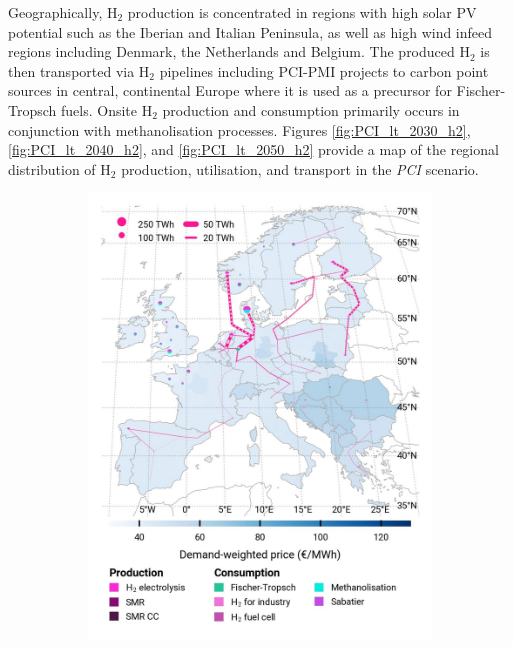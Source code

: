\documentclass[pdflatex,sn-nature]{sn-jnl}%
\theoremstyle{thmstyleone}%
\theoremstyle{thmstyletwo}%
\theoremstyle{thmstylethree}%
\begin{document}
Geographically, H$_2$ production is concentrated in regions with high solar PV potential such as the Iberian and Italian Peninsula, as well as high wind infeed regions including Denmark, the Netherlands and Belgium. The produced H$_2$ is then transported via H$_2$ pipelines including PCI-PMI projects to carbon point sources  in central, continental Europe where it is used as a precursor for Fischer-Tropsch fuels. Onsite H$_2$ production and consumption primarily occurs in conjunction with methanolisation processes. Figures \ref{fig:PCI_lt_2030_h2}, \ref{fig:PCI_lt_2040_h2}, and \ref{fig:PCI_lt_2050_h2} provide a map of the regional distribution of H$_2$ production, utilisation, and transport in the \textit{PCI} scenario.

\begin{figure}[htbp]
  \centering
  \begin{subfigure}[t]{0.32\textwidth}
      \vspace{0pt}
      \includegraphics[width=1\textwidth]{figures/pci___base_s_adm___2030-balance_map_H2.jpg}

\end{subfigure}
\end{figure}
\end{document}
